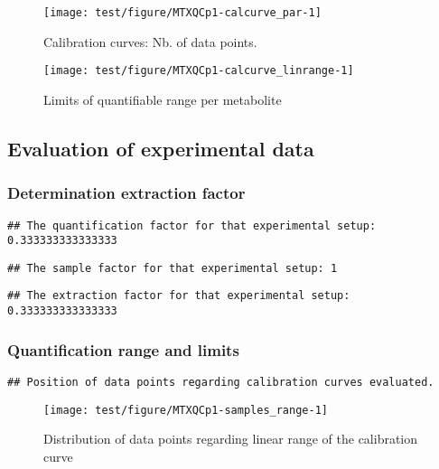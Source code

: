 \documentclass[9pt,]{article}
\begin{document}
\begin{figure}

{\centering \texttt{[image: test/figure/MTXQCp1-calcurve\_par-1]} 

}

\caption{Calibration curves: Nb. of data points.}\label{fig:calcurve_par}
\end{figure}

\begin{figure}

{\centering \texttt{[image: test/figure/MTXQCp1-calcurve\_linrange-1]} 

}

\caption{Limits of quantifiable range per metabolite}\label{fig:calcurve_linrange}
\end{figure}

\subsection{Evaluation of experimental
data}\label{evaluation-of-experimental-data}

\subsubsection{Determination extraction
factor}\label{determination-extraction-factor}

\begin{verbatim}
## The quantification factor for that experimental setup: 0.333333333333333
\end{verbatim}

\begin{verbatim}
## The sample factor for that experimental setup: 1
\end{verbatim}

\begin{verbatim}
## The extraction factor for that experimental setup: 0.333333333333333
\end{verbatim}

\subsubsection{Quantification range and
limits}\label{quantification-range-and-limits}

\begin{verbatim}
## Position of data points regarding calibration curves evaluated.
\end{verbatim}

\begin{figure}

{\centering \texttt{[image: test/figure/MTXQCp1-samples\_range-1]} 

}

\caption{Distribution of data points regarding linear range of the calibration curve}\label{fig:samples_range}
\end{figure}
\end{document}
